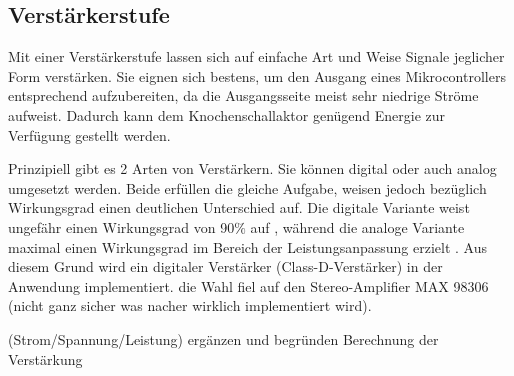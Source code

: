 \subsection{Verstärkerstufe} \label{sec:verstaerkerstufe}

Mit einer Verstärkerstufe lassen sich auf einfache Art und Weise Signale jeglicher Form verstärken. Sie eignen sich bestens, um den Ausgang eines Mikrocontrollers entsprechend aufzubereiten, da die Ausgangsseite meist sehr niedrige Ströme aufweist. Dadurch kann dem Knochenschallaktor genügend Energie zur Verfügung gestellt werden.

Prinzipiell gibt es 2 Arten von Verstärkern. Sie können digital oder auch analog umgesetzt werden. Beide erfüllen die gleiche Aufgabe, weisen jedoch bezüglich Wirkungsgrad einen deutlichen Unterschied auf. Die digitale Variante weist ungefähr einen Wirkungsgrad von 90$\%$ auf \cite{BoneConductorAdafruit}, während die analoge Variante maximal einen Wirkungsgrad im Bereich der Leistungsanpassung erzielt \cite{Niklaus_Skript}. Aus diesem Grund wird ein digitaler Verstärker (Class-D-Verstärker) in der Anwendung implementiert. die Wahl fiel auf den Stereo-Amplifier MAX 98306 (nicht ganz sicher was nacher wirklich implementiert wird).

(Strom/Spannung/Leistung) ergänzen und begründen
Berechnung der Verstärkung